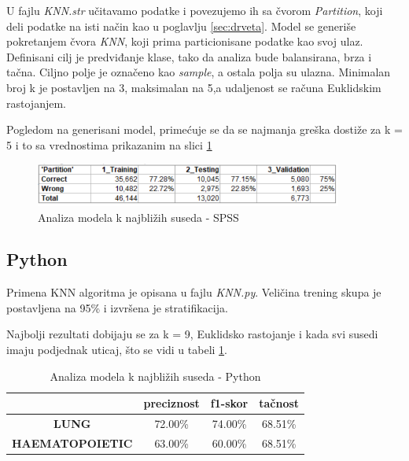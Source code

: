 \documentclass[a4paper]{article}
\begin{document}
U fajlu \textit{KNN.str} učitavamo podatke i povezujemo ih sa čvorom \textit{Partition}, koji deli podatke na isti način kao u poglavlju \ref{sec:drveta}. Model se generiše pokretanjem čvora \textit{KNN}, koji prima particionisane podatke kao svoj ulaz. Definisani cilj je predviđanje klase, tako da analiza bude balansirana, brza i tačna. Ciljno polje je označeno kao \textit{sample}, a ostala polja su ulazna. Minimalan broj k je postavljen na 3,  maksimalan na 5,a udaljenost se računa Euklidskim rastojanjem.

Pogledom na generisani model, primećuje se da se najmanja greška dostiže za k = 5 i to sa vrednostima prikazanim na slici \ref{fig:knn}

        \begin{figure}[ht!]
                \centering
                \includegraphics[width=0.9\textwidth]{KNN_analysis.PNG}
                \caption{Analiza modela k najbližih suseda - SPSS}
                \label{fig:knn}
            \end{figure}
            
\subsection{Python}

Primena KNN algoritma je opisana u fajlu \textit{KNN.py}. Veličina trening skupa je postavljena na 95\% i izvršena je stratifikacija. 



Najbolji rezultati dobijaju se za k = 9, Euklidsko rastojanje i kada svi susedi imaju podjednak uticaj, što se vidi u tabeli \ref{tab:knn}.
\begin{table}[ht!]
            \begin{center}
            \caption{Analiza modela k najbližih suseda - Python}
            \label{tab:knn}
            \begin{tabular}{c|c|c|c} \hline
            & \textbf{preciznost} & \textbf{f1-skor} & \textbf{tačnost}\\ \hline
            \textbf{LUNG} & 72.00\% & 74.00\% & 68.51\%\\ \hline
            \textbf{HAEMATOPOIETIC} & 63.00\% & 60.00\% & 68.51\%\\ \hline
            \end{tabular}
            \end{center}
        \end{table}
\end{document}
